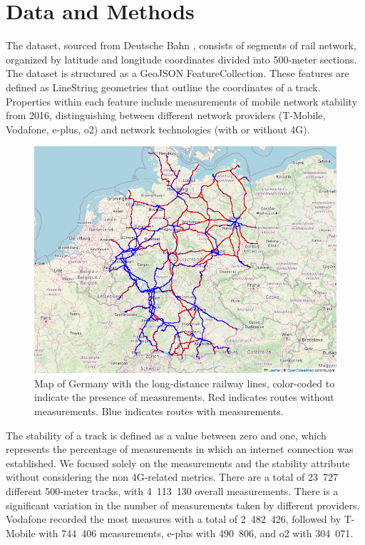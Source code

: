 \documentclass{article}
\theoremstyle{plain}
\theoremstyle{definition}
\theoremstyle{remark}
\begin{document}
\section{Data and Methods}\label{sec:methods}
The dataset, sourced from Deutsche Bahn \citep{db-netzradar}, consists of segments of rail network, organized by latitude and longitude coordinates divided into 500-meter sections. The dataset is structured as a GeoJSON FeatureCollection. These features are defined as LineString geometries that outline the coordinates of a track. Properties within each feature include measurements of mobile network stability from 2016, distinguishing between different network providers (T-Mobile, Vodafone, e-plus, o2) and network technologies (with or without 4G). 
 \begin{figure}[H]
 \vskip 0.2in
 \begin{center}
\centerline{\includegraphics[width=\columnwidth]{EmptyStabilityMap.png}}
\caption{Map of Germany with the long-distance railway lines, color-coded to indicate the presence of measurements. Red indicates routes without measurements. Blue indicates routes with measurements.}
 \label{fig:mapGauss}
 \end{center}
 \vskip -0.2in
 \end{figure} 
The stability of a track is defined as a value between zero and one, which represents the percentage of measurements in which an internet connection was established.
We focused solely on the measurements and the stability attribute without considering the non 4G-related metrics. 
There are a total of 23~727 different 500-meter tracks, with  4~113~130 overall measurements. There is a significant variation in the number of measurements taken by different providers. Vodafone recorded the most measures with a total of 2~482~426, followed by T-Mobile with 744~406 measurements, e-plus with 490~806, and o2 with 304~071.
\end{document}

